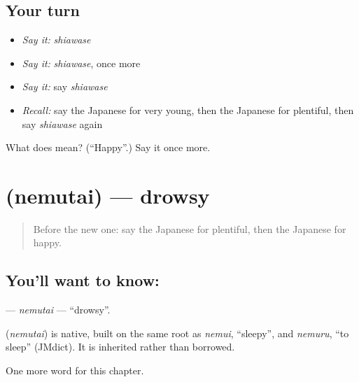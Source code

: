 \subsection*{Your turn}
\begin{itemize}
\raggedright
  \item \emph{Say it:} \emph{shiawase}
  \item \emph{Say it:} \emph{shiawase}, once more
  \item \emph{Say it:} say \emph{shiawase}
  \item \emph{Recall:} say the Japanese for very young, then the Japanese for plentiful, then say \emph{shiawase} again
\end{itemize}

\begin{tcolorbox}[breakable,colback=teal!4,colframe=teal!35!black,title={Before you move on}]
What does  mean? (\textquotedblleft{}Happy\textquotedblright{}.) Say it once more.
\end{tcolorbox}
\section[\texorpdfstring{\ja{ねむたい} (nemutai)}{ねむたい (nemutai)}]{ (nemutai) — drowsy}

\label{lesson:JA-C126-nemutai}



\begin{quote}
Before the new one: say the Japanese for plentiful, then the Japanese for happy.
\end{quote}

\subsection*{You'll want to know: }
\textbf{} — \emph{nemutai} — \textquotedblleft{}drowsy\textquotedblright{}.

\begin{cousinweb}
\textbf{} (\emph{nemutai}) is native, built on the same root as \emph{nemui}, \textquotedblleft{}sleepy\textquotedblright{}, and \emph{nemuru}, \textquotedblleft{}to sleep\textquotedblright{} (JMdict). It is inherited rather than borrowed.
\end{cousinweb}

\begin{grammarlens}[title={What you've built}]
One more word for this chapter.
\end{grammarlens}

